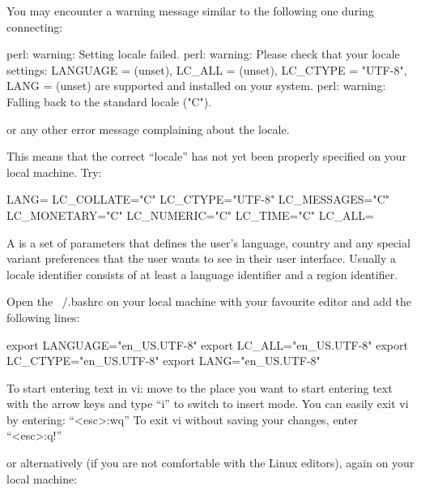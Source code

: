 \begin{tip}

You may encounter a warning message similar to the following one during connecting:

\begin{prompt}
perl: warning: Setting locale failed.
perl: warning: Please check that your locale settings:
LANGUAGE = (unset),
LC_ALL = (unset),
LC_CTYPE = "UTF-8",
LANG = (unset)
    are supported and installed on your system.
perl: warning: Falling back to the standard locale ("C").
\end{prompt}

or any other error message complaining about the locale.

This means that the correct ``locale'' has not yet been properly specified on
your local machine. Try:

\begin{prompt}
LANG=
LC_COLLATE="C"
LC_CTYPE="UTF-8"
LC_MESSAGES="C"
LC_MONETARY="C"
LC_NUMERIC="C"
LC_TIME="C"
LC_ALL=
\end{prompt}
\end{tip}

A  is a set of parameters that defines the user's language,
country and any special variant preferences that the user wants to see in their
user interface. Usually a locale identifier consists of at least a language
identifier and a region identifier.

\ifmacORlinux
Open the  ~/.bashrc on your local machine with your
favourite editor and add the following lines:

\begin{prompt}
export LANGUAGE="en_US.UTF-8"
export LC_ALL="en_US.UTF-8"
export LC_CTYPE="en_US.UTF-8"
export LANG="en_US.UTF-8"
\end{prompt}

\begin{tip}[vi]
To start entering text in vi: move to the place you want to start entering text
with the arrow keys and type ``i'' to switch to insert mode.  You can easily
exit vi by entering: ``<esc>:wq''
To exit vi without saving your changes, enter ``<esc>:q!''
\end{tip}

or alternatively (if you are not comfortable with the Linux editors), again on your local machine:

